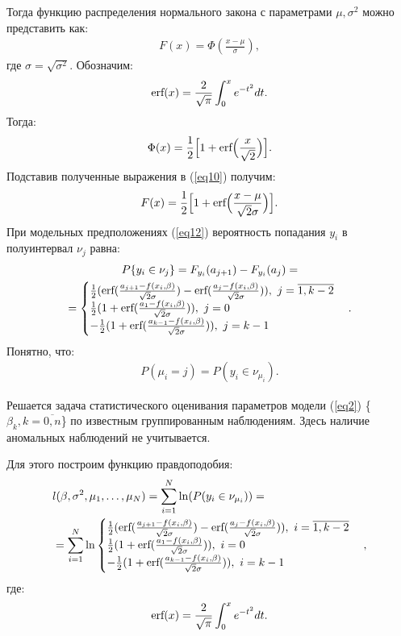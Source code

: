 Тогда функцию распределения нормального закона с параметрами $\mu,\sigma^2$ можно представить как:
\begin{eqnarray}
    \label{eq10}F(x)=\Phi(\frac{x-\mu}{\sigma}),
\end{eqnarray}
где $\sigma = \sqrt{\sigma^2}$. \hfill\break
Обозначим:
\begin{eqnarray}
    \textup{erf}(x)=\frac{2}{\sqrt{\pi}}\int_0^{x}e^{-t^2}dt.
\end{eqnarray}
Тогда:
\begin{eqnarray}
    \Phi(x)= \frac{1}{2} \Big[1+\textup{erf}\Big(\frac{x}{\sqrt{2}} \Big) \Big].
\end{eqnarray}
Подставив полученные выражения в (\ref{eq10}) получим:
\begin{eqnarray}
    F(x)= \frac{1}{2} \Big[1+\textup{erf}\Big(\frac{x-\mu}{\sqrt{2}\sigma} \Big) \Big].
\end{eqnarray}
При модельных предположениях (\ref{eq12}) вероятность попадания $y_i$ в полуинтервал $\nu_j$ равна:
\begin{multline}
    P\{y_i\in\nu_j\}= F_{y_i}(a_{j+1})-F_{y_i}(a_{j})=\\
    =\begin{cases}
        \frac{1}{2}(\textup{erf}(\frac{a_{j+1}-f(x_i,\beta)}{\sqrt{2}\sigma})-\textup{erf}(\frac{a_{j}-f(x_i,\beta)}{\sqrt{2}\sigma})),~j=\overline{1,k-2}\\
        \frac{1}{2}(1+\textup{erf}(\frac{a_{1}-f(x_i,\beta)}{\sqrt{2}\sigma})),~j=0\\
        -\frac{1}{2}(1+\textup{erf}(\frac{a_{k-1}-f(x_i,\beta)}{\sqrt{2}\sigma})),~j=k-1
    \end{cases}.
\end{multline}
Понятно, что:
\begin{eqnarray}
    P(\mu_i=j)=P(y_i\in \nu_{\mu_i}).
\end{eqnarray}

Решается задача статистического оценивания параметров модели (\ref{eq2}) \{$\beta_k, k=\overline{0,n}$\} по известным группированным наблюдениям. Здесь наличие аномальных наблюдений не учитывается.

Для этого построим функцию правдоподобия:
\begin{eqnarray}
    \label{eq22}\label{eq23}&l(\beta,\sigma^2, \mu_1,\dots, \mu_{N})=\sum\limits_{i=1}^{N}\ln(P(y_i\in \nu_{\mu_i}))=\\
    &=\sum\limits_{i=1}^{N}\ln\begin{cases}
        \frac{1}{2}(\textup{erf}(\frac{a_{j+1}-f(x_i,\beta)}{\sqrt{2}\sigma})-\textup{erf}(\frac{a_{j}-f(x_i,\beta)}{\sqrt{2}\sigma})),~i=\overline{1,k-2}\\
        \frac{1}{2}(1+\textup{erf}(\frac{a_{1}-f(x_i,\beta)}{\sqrt{2}\sigma})),~i=0\\
        -\frac{1}{2}(1+\textup{erf}(\frac{a_{k-1}-f(x_i,\beta)}{\sqrt{2}\sigma})),~i=k-1
    \end{cases},
\end{eqnarray}
где:
\begin{eqnarray}
    \textup{erf}(x)=\frac{2}{\sqrt{\pi}}\int_0^{x}e^{-t^2}dt.
\end{eqnarray}

